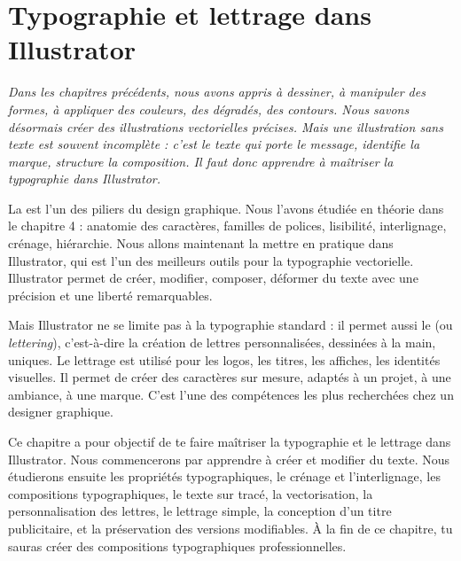 
\chapter{Typographie et lettrage dans Illustrator}

\noindent
\textit{Dans les chapitres précédents, nous avons appris à dessiner, à manipuler des formes, à appliquer des couleurs, des dégradés, des contours. Nous savons désormais créer des illustrations vectorielles précises. Mais une illustration sans texte est souvent incomplète : c'est le texte qui porte le message, identifie la marque, structure la composition. Il faut donc apprendre à maîtriser la typographie dans Illustrator.}

\vspace{1em}

\noindent
La  est l'un des piliers du design graphique. Nous l'avons étudiée en théorie dans le chapitre 4 : anatomie des caractères, familles de polices, lisibilité, interlignage, crénage, hiérarchie. Nous allons maintenant la mettre en pratique dans Illustrator, qui est l'un des meilleurs outils pour la typographie vectorielle. Illustrator permet de créer, modifier, composer, déformer du texte avec une précision et une liberté remarquables.

\vspace{1em}

\noindent
Mais Illustrator ne se limite pas à la typographie standard : il permet aussi le  (ou \emph{lettering}), c'est-à-dire la création de lettres personnalisées, dessinées à la main, uniques. Le lettrage est utilisé pour les logos, les titres, les affiches, les identités visuelles. Il permet de créer des caractères sur mesure, adaptés à un projet, à une ambiance, à une marque. C'est l'une des compétences les plus recherchées chez un designer graphique.

\vspace{1em}

\noindent
Ce chapitre a pour objectif de te faire maîtriser la typographie et le lettrage dans Illustrator. Nous commencerons par apprendre à créer et modifier du texte. Nous étudierons ensuite les propriétés typographiques, le crénage et l'interlignage, les compositions typographiques, le texte sur tracé, la vectorisation, la personnalisation des lettres, le lettrage simple, la conception d'un titre publicitaire, et la préservation des versions modifiables. À la fin de ce chapitre, tu sauras créer des compositions typographiques professionnelles.

